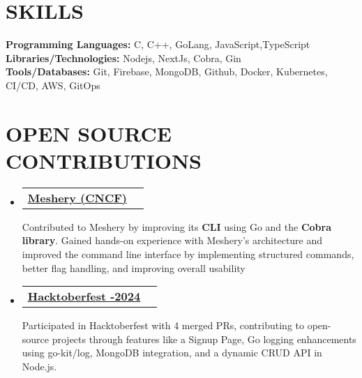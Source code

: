 \documentclass[letterpaper,11pt]{article}
\makeatletter
\newcommand{\resumeItem}[1]{
  \item\small{
    {#1 \vspace{-2pt}}
  }
}
\newcommand{\resumeProjectHeading}[2]{
    \item
    \begin{tabular*}{1.001\textwidth}{l@{\extracolsep{\fill}}r}
      \small#1 & \textbf{\small #2}\\
    \end{tabular*}\vspace{-7pt}
}
\newcommand{\resumeSubHeadingListStart}{\begin{itemize}[leftmargin=0.0in, label={}]}
\newcommand{\resumeItemListEnd}{\end{itemize}\vspace{-5pt}}
\makeatother
\begin{document}
%
\section{SKILLS}
 \begin{itemize}[leftmargin=0.15in, label={}]
    \small{\item{
     \textbf{\normalsize{Programming Languages:}}{ \normalsize{C, C++, GoLang, JavaScript,TypeScript}} \\
     \textbf{\normalsize{Libraries/Technologies:}}{\normalsize{ Nodejs, NextJs, Cobra, Gin}}
     \\
     \textbf{\normalsize{Tools/Databases:}}{\normalsize{ Git, Firebase, MongoDB, Github, Docker, Kubernetes, CI/CD, AWS, GitOps}}
    }}
 \end{itemize}
 \vspace{-14pt}
\section{OPEN SOURCE CONTRIBUTIONS}
\vspace{-5pt}
\resumeSubHeadingListStart


\resumeProjectHeading
{\href{https://github.com/meshery/meshery}{\textbf{\large{\underline{Meshery (CNCF)}}}} 
\href{https://gist.github.com/Arpit529Srivastava/7f690bca6f7bc55bbc7b2f53d274bc02}{\raisebox{-0.1\height}\faExternalLink}}

\resumeItem{\normalsize{Contributed to Meshery by improving its \textbf{CLI} using Go and the \textbf{Cobra library}. Gained hands-on experience with Meshery's architecture and improved the command line interface by implementing structured commands, better flag handling, and improving overall usability}}

\vspace{-12pt}

\resumeProjectHeading
{\href{}{\textbf{\large\underline{Hacktoberfest -2024}} } 
\href{https://gist.github.com/Arpit529Srivastava/b3f9f6159ac0b07b2a85ca01ed1ba138}{\raisebox{-0.1\height}{\faExternalLink}}}

\resumeItem{\normalsize{Participated in Hacktoberfest with 4 merged PRs, contributing to open-source projects through features like a Signup Page, Go logging enhancements using go-kit/log, MongoDB integration, and a dynamic CRUD API in Node.js.}}
\resumeItemListEnd
\end{document}
